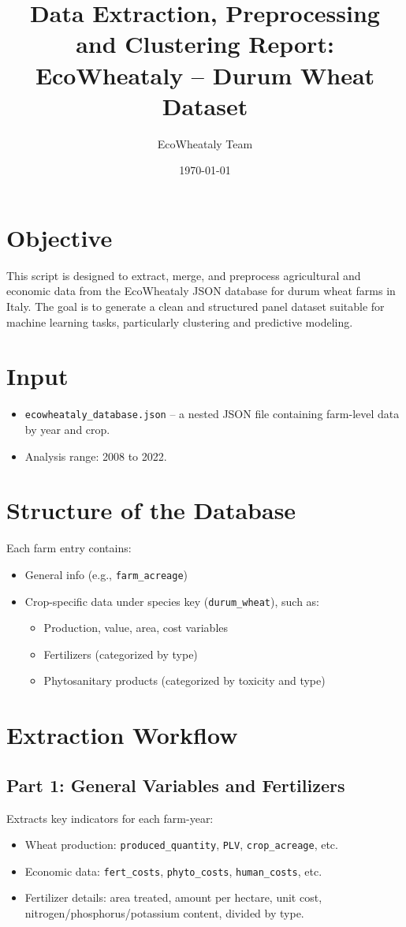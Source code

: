 \documentclass[a4paper,12pt]{article}
\title{Data Extraction, Preprocessing and Clustering Report:\\ EcoWheataly – Durum Wheat Dataset}
\author{EcoWheataly Team}
\date{\today}
\begin{document}
\maketitle

\section{Objective}
This script is designed to extract, merge, and preprocess agricultural and economic data from the EcoWheataly JSON database for durum wheat farms in Italy. The goal is to generate a clean and structured panel dataset suitable for machine learning tasks, particularly clustering and predictive modeling.

\section{Input}
\begin{itemize}
    \item \texttt{ecowheataly\_database.json} – a nested JSON file containing farm-level data by year and crop.
    \item Analysis range: 2008 to 2022.
\end{itemize}

\section{Structure of the Database}
Each farm entry contains:
\begin{itemize}
    \item General info (e.g., \texttt{farm\_acreage})
    \item Crop-specific data under species key (\texttt{durum\_wheat}), such as:
    \begin{itemize}
        \item Production, value, area, cost variables
        \item Fertilizers (categorized by type)
        \item Phytosanitary products (categorized by toxicity and type)
    \end{itemize}
\end{itemize}

\section{Extraction Workflow}
\subsection{Part 1: General Variables and Fertilizers}
Extracts key indicators for each farm-year:
\begin{itemize}
    \item Wheat production: \texttt{produced\_quantity}, \texttt{PLV}, \texttt{crop\_acreage}, etc.
    \item Economic data: \texttt{fert\_costs}, \texttt{phyto\_costs}, \texttt{human\_costs}, etc.
    \item Fertilizer details: area treated, amount per hectare, unit cost, nitrogen/phosphorus/potassium content, divided by type.
\end{itemize}
\end{document}
